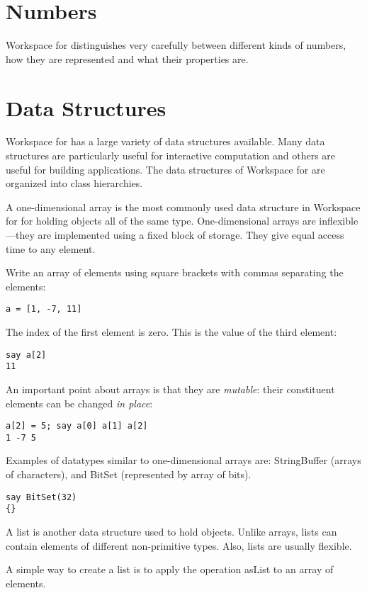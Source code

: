  \section{Numbers}

Workspace for \nr{} distinguishes very carefully between different kinds of numbers, how they are represented and what their properties are.

 \section{Data Structures}

Workspace for \nr{} has a large variety of data structures available. Many data structures are particularly useful for interactive computation and others are useful for building applications. The data structures of Workspace for \nr{} are organized into class hierarchies.

A one-dimensional array is the most commonly used data structure in Workspace for \nr{} for holding objects all of the same type. One-dimensional arrays are inflexible---they are implemented using a fixed block of storage. They give equal access time to any element.

Write an array of elements using square brackets with commas separating the elements:
\begin{verbatim}
a = [1, -7, 11]
\end{verbatim}
The index of the first element is zero. This is the value of the third element:

\begin{verbatim}
say a[2]
11
\end{verbatim}
An important point about arrays is that they are \emph{mutable}: their constituent elements can be changed \emph{in place}:

\begin{verbatim}
a[2] = 5; say a[0] a[1] a[2]
1 -7 5
\end{verbatim}
Examples of datatypes similar to one-dimensional arrays are: StringBuffer (arrays of characters), and BitSet (represented by array of bits).

\begin{verbatim}
say BitSet(32)
{}
\end{verbatim}
A list is another data structure used to hold objects. Unlike arrays, lists can contain elements of different non-primitive types. Also, lists are usually flexible.

A simple way to create a list is to apply the operation asList to an array of elements.


